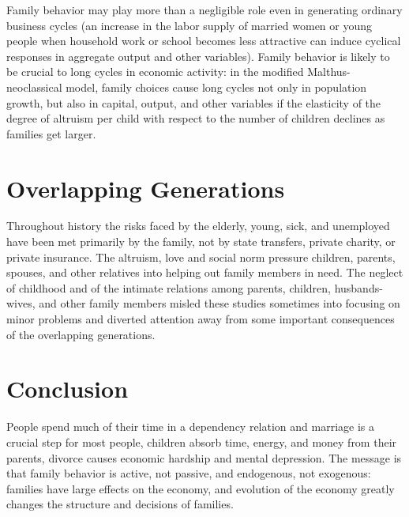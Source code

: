 \documentclass[11pt]{article}
\begin{document}
Family behavior may play more than a negligible role even in generating ordinary business cycles (an increase in the labor supply of married women or young people when household work or school becomes less attractive can induce cyclical responses in aggregate output and other variables). Family behavior is likely to be crucial to long cycles in economic activity: in the modified Malthus-neoclassical model, family choices cause long cycles not only in population growth, but also in capital, output, and other variables if the elasticity of the degree of altruism per child with respect to the number of children declines as families get larger. 

\section{Overlapping Generations}
Throughout history the risks faced by the elderly, young, sick, and unemployed have been met primarily by the family, not by state transfers, private charity, or private insurance. The altruism, love and social norm pressure children, parents, spouses, and other relatives into helping out family members in need. The neglect of childhood and of the intimate relations among parents, children, husbands-wives, and other family members misled these studies sometimes into focusing on minor problems and diverted attention away from some important consequences of the overlapping generations. 



\section{Conclusion}
People spend much of their time in a dependency relation and marriage is a crucial step for most people, children absorb time, energy, and money from their parents, divorce causes economic hardship and mental depression. The message is that family behavior is active, not passive, and endogenous, not exogenous: families have large effects on the economy, and evolution of the economy greatly changes the structure and decisions of families. 


 
\end{document}
